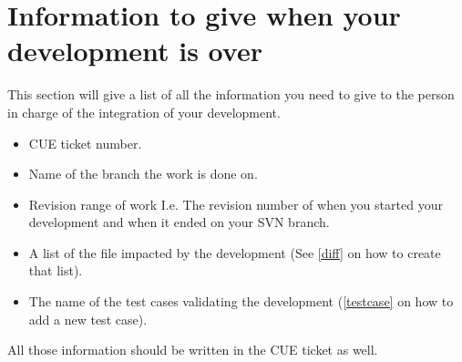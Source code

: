 \chapter{Information to give when your development is over}
This section will give a list of all the information you need to give to the
person in charge of the integration of your development.
%
\begin{itemize}
\item CUE ticket number.
\item Name of the branch the work is done on.
\item Revision range of work I.e. The revision number of when you started your
development and when it ended on your SVN branch.
\item A list of the file impacted by the development (See \ref{diff} on how to
create that list).
\item The name of the test cases validating the development (\ref{testcase} on how to add a new test case).
\end{itemize}

All those information should be written in the CUE ticket as well.


